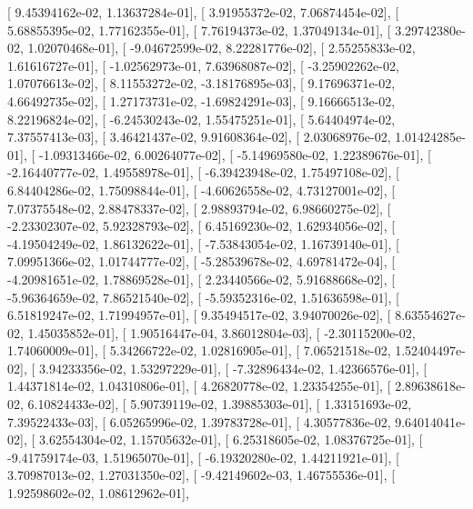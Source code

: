 \documentclass{article}
\begin{document}
       [  9.45394162e-02,   1.13637284e-01],
       [  3.91955372e-02,   7.06874454e-02],
       [  5.68855395e-02,   1.77162355e-01],
       [  7.76194373e-02,   1.37049134e-01],
       [  3.29742380e-02,   1.02070468e-01],
       [ -9.04672599e-02,   8.22281776e-02],
       [  2.55255833e-02,   1.61616727e-01],
       [ -1.02562973e-01,   7.63968087e-02],
       [ -3.25902262e-02,   1.07076613e-02],
       [  8.11553272e-02,  -3.18176895e-03],
       [  9.17696371e-02,   4.66492735e-02],
       [  1.27173731e-02,  -1.69824291e-03],
       [  9.16666513e-02,   8.22196824e-02],
       [ -6.24530243e-02,   1.55475251e-01],
       [  5.64404974e-02,   7.37557413e-03],
       [  3.46421437e-02,   9.91608364e-02],
       [  2.03068976e-02,   1.01424285e-01],
       [ -1.09313466e-02,   6.00264077e-02],
       [ -5.14969580e-02,   1.22389676e-01],
       [ -2.16440777e-02,   1.49558978e-01],
       [ -6.39423948e-02,   1.75497108e-02],
       [  6.84404286e-02,   1.75098844e-01],
       [ -4.60626558e-02,   4.73127001e-02],
       [  7.07375548e-02,   2.88478337e-02],
       [  2.98893794e-02,   6.98660275e-02],
       [ -2.23302307e-02,   5.92328793e-02],
       [  6.45169230e-02,   1.62934056e-02],
       [ -4.19504249e-02,   1.86132622e-01],
       [ -7.53843054e-02,   1.16739140e-01],
       [  7.09951366e-02,   1.01744777e-02],
       [ -5.28539678e-02,   4.69781472e-04],
       [ -4.20981651e-02,   1.78869528e-01],
       [  2.23440566e-02,   5.91688668e-02],
       [ -5.96364659e-02,   7.86521540e-02],
       [ -5.59352316e-02,   1.51636598e-01],
       [  6.51819247e-02,   1.71994957e-01],
       [  9.35494517e-02,   3.94070026e-02],
       [  8.63554627e-02,   1.45035852e-01],
       [  1.90516447e-04,   3.86012804e-03],
       [ -2.30115200e-02,   1.74060009e-01],
       [  5.34266722e-02,   1.02816905e-01],
       [  7.06521518e-02,   1.52404497e-02],
       [  3.94233356e-02,   1.53297229e-01],
       [ -7.32896434e-02,   1.42366576e-01],
       [  1.44371814e-02,   1.04310806e-01],
       [  4.26820778e-02,   1.23354255e-01],
       [  2.89638618e-02,   6.10824433e-02],
       [  5.90739119e-02,   1.39885303e-01],
       [  1.33151693e-02,   7.39522433e-03],
       [  6.05265996e-02,   1.39783728e-01],
       [  4.30577836e-02,   9.64014041e-02],
       [  3.62554304e-02,   1.15705632e-01],
       [  6.25318605e-02,   1.08376725e-01],
       [ -9.41759174e-03,   1.51965070e-01],
       [ -6.19320280e-02,   1.44211921e-01],
       [  3.70987013e-02,   1.27031350e-02],
       [ -9.42149602e-03,   1.46755536e-01],
       [  1.92598602e-02,   1.08612962e-01],
\end{document}
